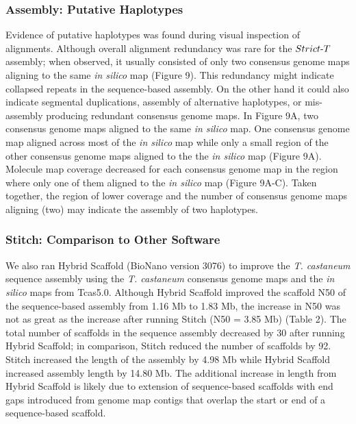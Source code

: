 \documentclass{bmcart}
\begin{document}
\subsubsection*{Assembly: Putative Haplotypes}

Evidence of putative haplotypes was found during visual inspection of alignments. Although overall alignment redundancy was rare for the $Strict\textnormal{-}T$ assembly; when observed, it usually consisted of only two consensus genome maps aligning to the same \textit{in silico} map (Figure 9). This redundancy might indicate collapsed repeats in the sequence-based assembly. On the other hand it could also indicate segmental duplications, assembly of alternative haplotypes, or mis-assembly producing redundant consensus genome maps. In Figure 9A, two consensus genome maps aligned to the same \textit{in silico} map. One consensus genome map aligned across most of the \textit{in silico} map while only a small region of the other consensus genome maps aligned to the the \textit{in silico} map (Figure 9A). Molecule map coverage decreased for each consensus genome map in the region where only one of them aligned to the \textit{in silico} map (Figure 9A-C). Taken together, the region of lower coverage and the number of consensus genome maps aligning (two) may indicate the assembly of two haplotypes.  

\subsubsection*{Stitch: Comparison to Other Software}

We also ran Hybrid Scaffold (BioNano version 3076) to improve the \textit{T. castaneum} sequence assembly using the \textit{T. castaneum} consensus genome maps and the \textit{in silico} maps from Tcas5.0. Although Hybrid Scaffold improved the scaffold N50 of the sequence-based assembly from 1.16 Mb to 1.83 Mb, the increase in N50 was not as great as the increase after running Stitch (N50 = 3.85 Mb) (Table 2). The total number of scaffolds in the sequence assembly decreased by 30 after running Hybrid Scaffold; in comparison, Stitch reduced the number of scaffolds by 92. Stitch increased the length of the assembly by 4.98 Mb while Hybrid Scaffold increased assembly length by 14.80 Mb. The additional increase in length from Hybrid Scaffold is likely due to extension of sequence-based scaffolds with end gaps introduced from genome map contigs that overlap the start or end of a sequence-based scaffold. 
\end{document}

